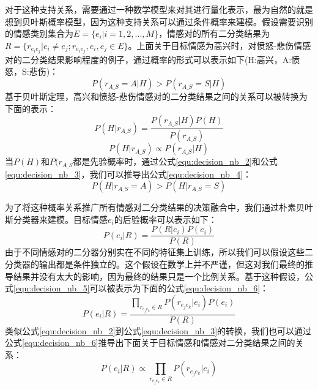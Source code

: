 对于这种支持关系，需要通过一种数学模型来对其进行量化表示，最为自然的就是想到贝叶斯概率模型，因为这种支持关系可以通过条件概率来建模。假设需要识别的情感类别集合为$E=\{e_i|i=1, 2,...,M\}$，情感对的所有二分类结果为$R = \{r_{e_ie_j}|e_i \neq e_j; r_{e_ie_j}, e_i, e_j \in E\}$。上面关于目标情感为高兴时，对愤怒-悲伤情感对的二分类结果影响程度的例子，通过概率的形式可以表示如下(H:高兴，A:愤怒，S:悲伤)：
\begin{equation}
\label{equ:decision_nb_1}
    P(r_{A\_S}=A|H) > P(r_{A\_S}=S|H)
\end{equation}
基于贝叶斯定理，高兴和愤怒-悲伤情感对的二分类结果之间的关系可以被转换为下面的表示：
\begin{equation}
\label{equ:decision_nb_2}
    P(H|r_{A\_S}) = \frac{P(r_{A\_S}|H)P(H)}{P(r_{A\_S})}
\end{equation}
\begin{equation}
\label{equ:decision_nb_3}
    P(H|r_{A\_S}) \propto P(r_{A\_S}|H)
\end{equation}
当$P(H)$和$P(r_{A\_S}$都是先验概率时，通过公式\ref{equ:decision_nb_2}和公式\ref{equ:decision_nb_3}，我们可以推导出公式\ref{equ:decision_nb_4}：
\begin{equation}
\label{equ:decision_nb_4}
    P(H|r_{A\_S}=A) > P(H|r_{A\_S}=S)
\end{equation}

为了将这种概率关系推广所有情感对二分类结果的决策融合中，我们通过朴素贝叶斯分类器来建模。目标情感$e_i$的后验概率可以表示如下：
\begin{equation}
\label{equ:decision_nb_5}
    P(e_i|R) = \frac{P(R|e_i)P(e_i)}{P(R)}
\end{equation}
由于不同情感对的二分器分别实在不同的特征集上训练，所以我们可以假设这些二分类器的输出都是条件独立的。这个假设在数学上并不严谨，但这对我们最终的推导结果并没有太大的影响，因为最终的结果只是一个比例关系。基于这种假设，公式\ref{equ:decision_nb_5}可以被表示为下面的公式\ref{equ:decision_nb_6}：
\begin{equation}
\label{equ:decision_nb_6}
    P(e_i|R) = \frac{\prod_{r_{e_je_k} \in R}P(r_{e_je_k}|e_i)P(e_i)}{P(R)}
\end{equation}
类似公式\ref{equ:decision_nb_2}到公式\ref{equ:decision_nb_3}的转换，我们也可以通过公式\ref{equ:decision_nb_6}推导出下面关于目标情感和情感对二分类结果之间的关系：
\begin{equation}
\label{equ:decision_nb_6}
    P(e_i|R) \propto \prod_{r_{e_je_k} \in R}P(r_{e_je_k}|e_i)
\end{equation}

